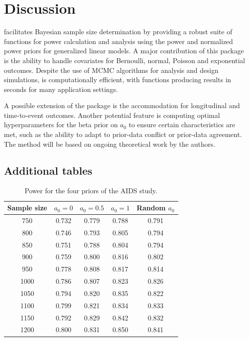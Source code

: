 \section*{Discussion} \label{sec:discussion}

 facilitates Bayesian sample size determination by providing a robust suite of functions for power calculation and analysis using the power and normalized power priors for generalized linear models. A major contribution of this package is the ability to handle covariates for Bernoulli, normal, Poisson and exponential outcomes. Despite the use of MCMC algorithms for analysis and design simulations,  is computationally efficient, with functions producing results in seconds for many application settings.

A possible extension of the package is the accommodation for longitudinal and time-to-event outcomes. Another potential feature is computing optimal hyperparameters for the beta prior on $a_0$ to ensure certain characteristics are met, such as the ability to adapt to prior-data conflict or prior-data agreement. The method will be based on ongoing theoretical work by the authors. 




\newpage

\begin{appendix}

\section{Additional tables} 

\begin{table}[ht]
\centering
\begin{tabular}{ccccc}
  \hline
 Sample size & $a_0=0$ & $a_0=0.5$ & $a_0=1$ & Random $a_0$ \\ 
    \hline
750 & 0.732 & 0.779 & 0.788 & 0.791 \\ 
800 & 0.746 & 0.793 & 0.805 & 0.794 \\ 
850 & 0.751 & 0.788 & 0.804 & 0.794 \\ 
900 & 0.759 & 0.800 & 0.816 & 0.802 \\ 
950 & 0.778 & 0.808 & 0.817 & 0.814 \\ 
1000 & 0.786 & 0.807 & 0.823 & 0.826 \\ 
1050 & 0.794 & 0.820 & 0.835 & 0.822 \\ 
1100 & 0.799 & 0.821 & 0.834 & 0.833 \\ 
1150 & 0.792 & 0.829 & 0.842 & 0.832 \\ 
1200 & 0.800 & 0.831 & 0.850 & 0.841 \\ 
  \hline
\end{tabular}
\caption{Power for the four priors of the AIDS study.}
\label{tab:powers}
\end{table}



\end{appendix}



